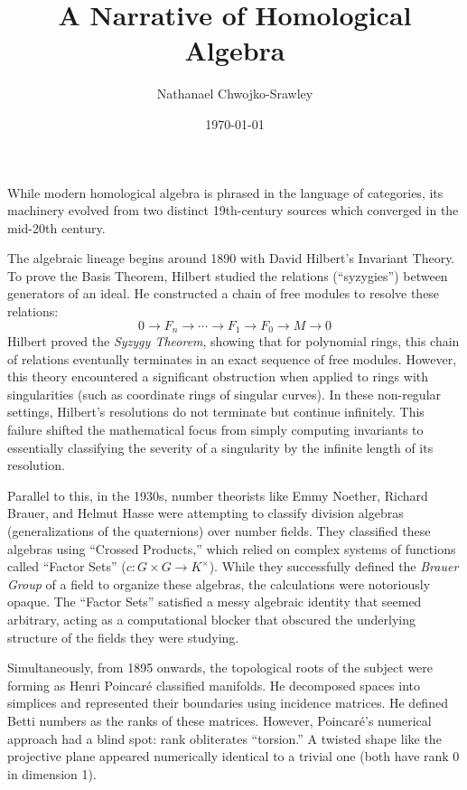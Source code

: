 \documentclass{article}
\title{A Narrative of Homological Algebra}
\author{Nathanael Chwojko-Srawley}
\date{\today}
\renewcommand{\maketitle}{
    \quad
    \vspace{1em}
  \begin{center}
      \LARGE\bfseries \thetitle \par
      \vspace{0.6em}
      \large
  \end{center}
    \vspace{1em}
}
\begin{document}
\maketitle


While modern homological algebra is phrased in the language of categories, its machinery evolved from two distinct 19th-century sources which converged in the mid-20th century.

The algebraic lineage begins around 1890 with David Hilbert's Invariant Theory. To prove the Basis Theorem, Hilbert studied the relations (``syzygies'') between generators of an ideal. He constructed a chain of free modules to resolve these relations:
\[
	0 \to F_{n} \to \cdots \to F_1 \to F_0 \to M \to 0
\]
Hilbert proved the \emph{Syzygy Theorem}, showing that for polynomial rings, this chain of relations eventually terminates in an exact sequence of free modules. However, this theory encountered a significant obstruction when applied to rings with singularities (such as coordinate rings of singular curves). In these non-regular settings, Hilbert's resolutions do not terminate but continue infinitely. This failure shifted the mathematical focus from simply computing invariants to essentially classifying the severity of a singularity by the infinite length of its resolution.

Parallel to this, in the 1930s, number theorists like Emmy Noether, Richard Brauer, and Helmut Hasse were attempting to classify division algebras (generalizations of the quaternions) over number fields. They classified these algebras using ``Crossed Products,'' which relied on complex systems of functions called ``Factor Sets'' ($c: G \times G \to K^\times$). While they successfully defined the \emph{Brauer Group} of a field to organize these algebras, the calculations were notoriously opaque. The ``Factor Sets'' satisfied a messy algebraic identity that seemed arbitrary, acting as a computational blocker that obscured the underlying structure of the fields they were studying.

Simultaneously, from 1895 onwards, the topological roots of the subject were forming as Henri Poincar\'e classified manifolds. He decomposed spaces into simplices and represented their boundaries using incidence matrices. He defined Betti numbers as the ranks of these matrices. However, Poincar\'e's numerical approach had a blind spot: rank obliterates ``torsion.'' A twisted shape like the projective plane appeared numerically identical to a trivial one (both have rank 0 in dimension 1).
\end{document}
